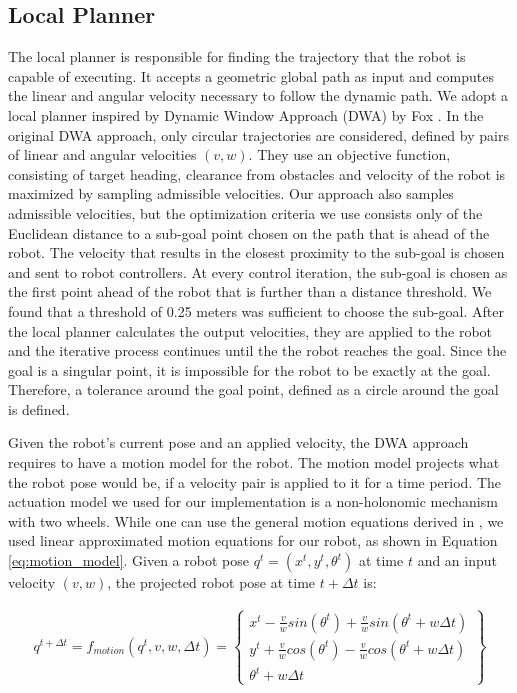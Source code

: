 \subsection{Local Planner}
\label{sec:navigation_local_planner}

The local planner is responsible for finding the trajectory that the robot is capable of executing. It accepts a geometric global path as input and computes the linear and angular velocity necessary to follow the dynamic path. We adopt a local planner inspired by Dynamic Window Approach (DWA) by Fox \cite{fox1997dynamic}. In the original DWA approach, only circular trajectories are considered, defined by pairs of linear and angular velocities $(v,w)$. They use an objective function, consisting of target heading, clearance from obstacles and velocity of the robot is maximized by sampling admissible velocities. Our approach also samples admissible velocities, but the optimization criteria we use consists only of the Euclidean distance to a sub-goal point chosen on the path that is ahead of the robot. The velocity that results in the closest proximity to the sub-goal is chosen and sent to robot controllers. At every control iteration, the sub-goal is chosen as the first point ahead of the robot that is further than a distance threshold. We found that a threshold of 0.25 meters was sufficient to choose the sub-goal. After the local planner calculates the output velocities, they are applied to the robot and the iterative process continues until the the robot reaches the goal. Since the goal is a singular point, it is impossible for the robot to be exactly at the goal. Therefore, a tolerance around the goal point, defined as a circle around the goal is defined.

Given the robot's current pose and an applied velocity, the DWA approach requires to have a motion model for the robot. The motion model projects what the robot pose would be, if a velocity pair is applied to it for a time period. The actuation model we used for our implementation is a non-holonomic mechanism with two wheels. While one can use the general motion equations derived in \cite{fox1997dynamic}, we used linear approximated motion equations for our robot, as shown in Equation \ref{eq:motion_model}. Given a robot pose $q^t=(x^t,y^t,\theta^t)$ at time $t$ and an input velocity $(v,w)$, the projected robot pose at time $t+\Delta t$ is:

\begin{align}
q^{t+\Delta t} = 
f_{motion}(q^t,v,w,\Delta t) =
\begin{Bmatrix}
x^t-\frac{v}{w}sin(\theta^t)+\frac{v}{w}sin(\theta^t+w \Delta t)\\
y^t+\frac{v}{w}cos(\theta^t)-\frac{v}{w}cos(\theta^t+w \Delta t)\\
\theta^t + w\Delta t
\end{Bmatrix}
\label{eq:motion_model}
\end{align}


